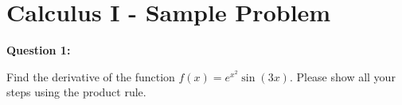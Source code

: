\documentclass[12pt]{article}
\begin{document}
\section*{Calculus I - Sample Problem}

\textbf{Question 1:}

Find the derivative of the function $f(x) = e^{x^2} \sin(3x)$. Please show all your steps using the product rule.


\vspace{5cm} %
\end{document}

